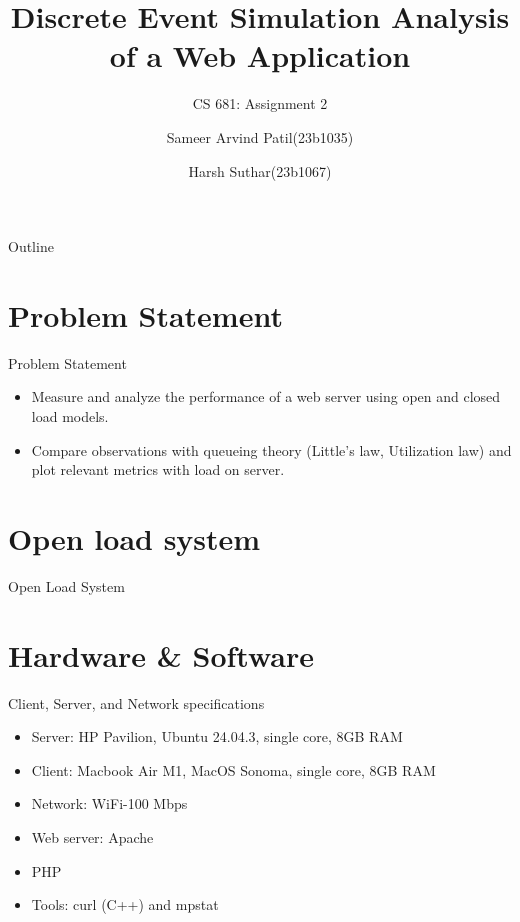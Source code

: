 \documentclass[10pt]{beamer}
\title[Discrete Event Simulation Analysis of a Web Application]{Discrete Event Simulation Analysis of a Web Application}
\subtitle{CS 681: Assignment 2}
\author[23b1035 \& 23b1067]{Sameer Arvind Patil(23b1035) \and Harsh Suthar(23b1067)}
\begin{document}
\begin{frame}
  \titlepage
\end{frame}

\begin{frame}{Outline}
  \tableofcontents
\end{frame}

\section{Problem Statement}
\begin{frame}{Problem Statement}
  \begin{itemize}
    \item Measure and analyze the performance of a web server using open and closed load models.
    \item Compare observations with queueing theory (Little's law, Utilization law) and plot relevant metrics with load on server.
  \end{itemize}
\end{frame}

\section{Open load system}
\begin{frame}{}
    \begin{center}
        \Huge{Open Load System}
    \end{center}
\end{frame}

\section{Hardware \& Software}
\begin{frame}{Client, Server, and Network specifications}
  \begin{itemize}
    \item Server: HP Pavilion, Ubuntu 24.04.3, single core, 8GB RAM  
    \item Client: Macbook Air M1, MacOS Sonoma, single core, 8GB RAM
    \item Network: WiFi-100 Mbps
    \item Web server: Apache
    \item PHP
    \item Tools: curl (C++) and mpstat
  \end{itemize}
\end{frame}
\end{document}
